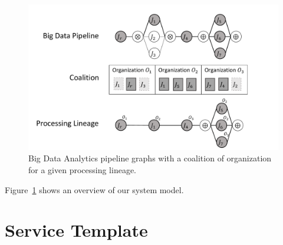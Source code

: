 
\begin{figure}[!t]
  \includegraphics[width=0.98\columnwidth]{generaleFig1.pdf}
  \caption{Big Data Analytics pipeline graphs with a coalition of organization for a given processing lineage.}\label{fig:BDpipeline}
\end{figure}

Figure~\ref{fig:BDpipeline} shows an overview of our system model.






\section{Service Template}
